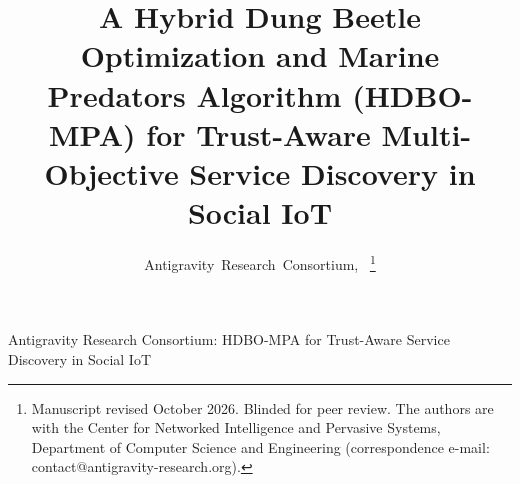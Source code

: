 \documentclass[journal,compsoc]{IEEEtran}
\begin{document}
\title{A Hybrid Dung Beetle Optimization and Marine Predators Algorithm (HDBO-MPA) for Trust-Aware Multi-Objective Service Discovery in Social IoT}

\author{Antigravity~Research~Consortium,~%
\thanks{Manuscript revised October 2026. Blinded for peer review. The authors are with the Center for Networked Intelligence and Pervasive Systems, Department of Computer Science and Engineering (correspondence e-mail: contact@antigravity-research.org).}%
}

%
{Antigravity Research Consortium: HDBO-MPA for Trust-Aware Service Discovery in Social IoT}

\maketitle
\end{document}
